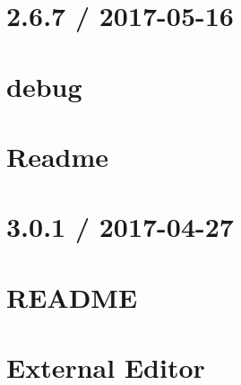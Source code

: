 \documentclass[twoside]{book}
\newcommand{\+}{\discretionary{\mbox{\scriptsize$\hookleftarrow$}}{}{}}
\begin{document}
\chapter{2.6.7 / 2017-\/05-\/16}
\label{md__c_1_workspace_demo_src_main_script_node_modules_express_node_modules_debug__c_h_a_n_g_e_l_o_g}

\chapter{debug}
\label{md__c_1_workspace_demo_src_main_script_node_modules_express_node_modules_debug__r_e_a_d_m_e}

\chapter{Readme}
\label{md__c_1_workspace_demo_src_main_script_node_modules_express__readme}

\chapter{3.0.1 / 2017-\/04-\/27}
\label{md__c_1_workspace_demo_src_main_script_node_modules_extend__c_h_a_n_g_e_l_o_g}

\chapter{R\+E\+A\+D\+ME}
\label{md__c_1_workspace_demo_src_main_script_node_modules_extend__r_e_a_d_m_e}

\chapter{External Editor}
\label{md__c_1_workspace_demo_src_main_script_node_modules_external-editor__r_e_a_d_m_e}

\end{document}
